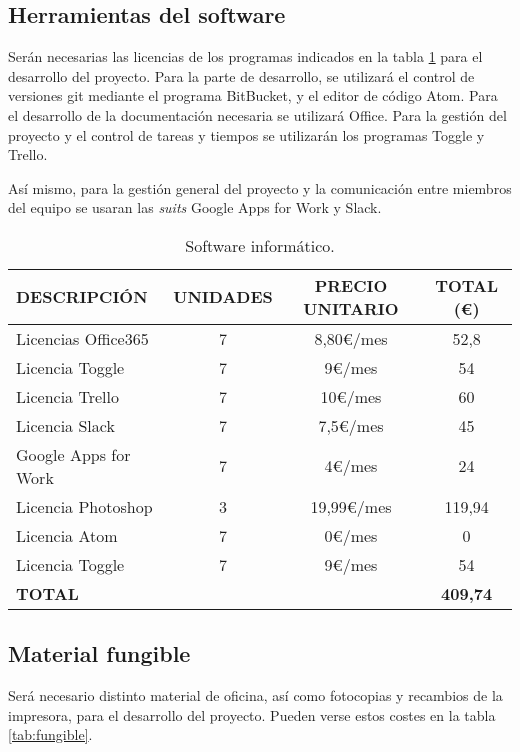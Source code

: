 \subsection{Herramientas del software}
\par Serán necesarias las licencias de los programas indicados en la tabla \ref{tab:software} para el desarrollo del proyecto. Para la parte de desarrollo, se utilizará el control de versiones git mediante el programa BitBucket, y el editor de código Atom. Para el desarrollo de la documentación necesaria se utilizará Office. Para la gestión del proyecto y el control de tareas y tiempos se utilizarán los programas Toggle y Trello.
\par Así mismo, para la gestión general del proyecto y la comunicación entre miembros del equipo se usaran las \textit{suits} Google Apps for Work y Slack.


\begin{table}[H]
\begin{center}
\begin{tabular}{l c c c}
\textbf{DESCRIPCIÓN} & \textbf{UNIDADES} & \textbf{PRECIO UNITARIO} & \textbf{TOTAL (\euro)}\\ \hline \hline
Licencias Office365 & 7 & 8,80\euro/mes & 52,8\\
Licencia Toggle & 7 & 9\euro/mes & 54\\
Licencia Trello & 7 & 10\euro/mes & 60\\
Licencia Slack & 7 & 7,5\euro/mes & 45\\
Google Apps for Work & 7 & 4\euro/mes & 24\\
Licencia Photoshop & 3 & 19,99\euro/mes & 119,94\\
Licencia Atom & 7 & 0\euro/mes & 0\\
Licencia Toggle & 7 & 9\euro/mes & 54\\ \hline \hline
\textbf{TOTAL} & & & \textbf{409,74}\\ \hline
\end{tabular}
\caption{Software informático.}
\label{tab:software}
\end{center}
\end{table}



\subsection{Material fungible}
\par Será necesario distinto material de oficina, así como fotocopias y recambios de la impresora, para el desarrollo del proyecto. Pueden verse estos costes en la tabla \ref{tab:fungible}.



